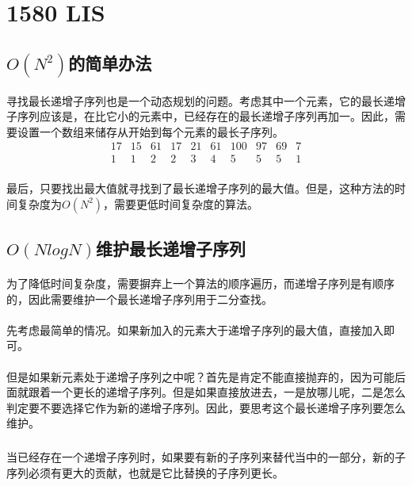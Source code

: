 \documentclass[UTF-8, 12pt]{ctexart}
\begin{document}
\section{1580 LIS}
    \subsection{$O(N^2)$的简单办法}
    \paragraph{}
    寻找最长递增子序列也是一个动态规划的问题。考虑其中一个元素，它的最长递增子序列应该是，在比它小的元素中，已经存在的最长递增子序列再加一。因此，需要设置一个数组来储存从开始到每个元素的最长子序列。
    \begin{equation}
    \begin{array}{cccccccccc}
    17 & 15 & 61 & 17 & 21 & 61 & 100 & 97 & 69 & 7\\
    1  & 1  & 2  & 2  & 3  & 4  & 5   & 5  & 5  & 1
    \end{array}
    \end{equation}
    \paragraph{}
    最后，只要找出最大值就寻找到了最长递增子序列的最大值。但是，这种方法的时间复杂度为$O(N^2)$，需要更低时间复杂度的算法。
    
    \subsection{$O(NlogN)$维护最长递增子序列}
    \paragraph{}
    为了降低时间复杂度，需要摒弃上一个算法的顺序遍历，而递增子序列是有顺序的，因此需要维护一个最长递增子序列用于二分查找。
    \paragraph{}
    先考虑最简单的情况。如果新加入的元素大于递增子序列的最大值，直接加入即可。
    \paragraph{}
    但是如果新元素处于递增子序列之中呢？首先是肯定不能直接抛弃的，因为可能后面就跟着一个更长的递增子序列。但是如果直接放进去，一是放哪儿呢，二是怎么判定要不要选择它作为新的递增子序列。因此，要思考这个最长递增子序列要怎么维护。
    \subparagraph{}
    当已经存在一个递增子序列时，如果要有新的子序列来替代当中的一部分，新的子序列必须有更大的贡献，也就是它比替换的子序列更长。
\end{document}
